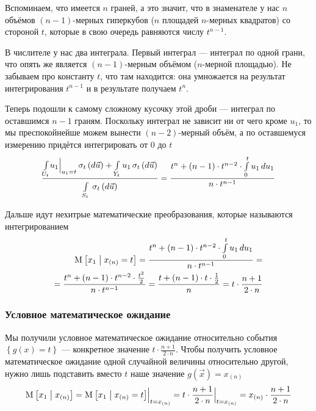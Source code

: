 Вспоминаем, что имеется $n$ граней, а это значит, что в знаменателе
у нас $n$ объёмов $\left( n-1 \right)$-мерных гиперкубов
($n$ площадей $n$-мерных квадратов)
со стороной $t$, которые в свою очередь равняются числу $t^{n-1}$.

В числителе у нас два интеграла.
Первый интеграл --- интеграл по одной грани, что опять же является
$\left( n-1 \right)$-мерным объёмом ($n$-мерной площадью).
Не забываем про константу $t$, что там находится: она умножается
на результат интегрирования $t^{n-1}$ и в результате получаем $t^n$.

Теперь подошли к самому сложному кусочку этой дроби ---
интеграл по оставшимся $n-1$ граням.
Поскольку интеграл не зависит ни от чего кроме $u_1$, то мы преспокойнейше
можем вынести $\left( n-2 \right)$-мерный объём, а по оставшемуся измерению
придётся интегрировать от $0$ до $t$
$$\frac{\integrall{U_t}{\sigma_{t}\left(d\vec{u} \right)}{
      \Bigl. u_1 \Bigr|_{u_1 = t}}
      + \integrall{Y_t}{\sigma_{t}\left(d\vec{u} \right)}{
      u_1}}{
      \integrall{S_t}{\sigma_{t}\left(d\vec{u} \right)}{}}
  = \frac{t^n + \left( n-1 \right) \cdot t^{n-2}
      \cdot \integral{0}{t}{u_1}{u_1}}{n \cdot t^{n-1}}$$

Дальше идут нехитрые математические преобразования,
которые называются интегрированием
\begin{align*}
  \Mean{x_1 \mcond x_{\left( n \right)} = t}
  = \frac{t^n + \left( n-1 \right) \cdot t^{n-2} 
      \cdot \integral{0}{t}{u_1}{u_1}}{n \cdot t^{n-1}} = \\
  = \frac{t^n + \left( n-1 \right) \cdot t^{n-2}
      \cdot \frac{t^2}{2}}{n \cdot t^{n-1}}
  = \frac{t + \left( n-1 \right) \cdot t \cdot \frac{1}{2}}{n}
  = t \cdot \frac{n+1}{2 \cdot n}
\end{align*}

\subsubsection{Условное математическое ожидание}
Мы получили условное математическое ожидание относительно события
$\left\{ g\left( x \right) = t \right\}$ --- конкретное значение
$t \cdot \frac{n+1}{2 \cdot n}$.
Чтобы получить условное математическое ожидание одной случайной величины
относительно другой, нужно лишь подставить вместо $t$
наше значение $g\left( \vec{x} \right) = x_{\left( n \right)}$
$$\Mean{x_1 \mcond x_{\left( n \right)}}
  = \Bigl. \Mean{x_1 \mcond x_{\left( n \right)} = t}
      \Bigr|_{t = x_{\left( n \right)}}
  = \Bigl. t \cdot \frac{n+1}{2 \cdot n} \Bigr|_{t = x_{\left( n \right)}}
  = x_{\left( n \right)} \cdot \frac{n+1}{2 \cdot n}$$


